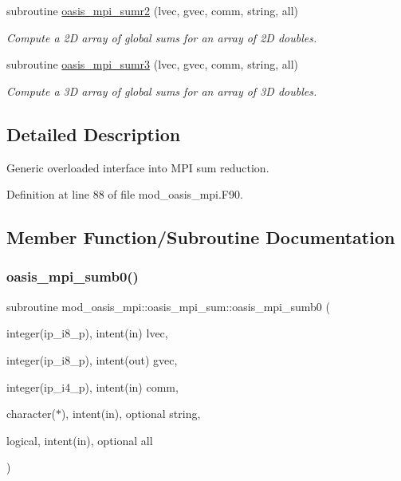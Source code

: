 \begin{DoxyCompactItemize}
subroutine \hyperlink{interfacemod__oasis__mpi_1_1oasis__mpi__sum_a45b443ca4b94c71ad7be5e6b653d8b1f}{oasis\+\_\+mpi\+\_\+sumr2} (lvec, gvec, comm, string, all)
\begin{DoxyCompactList}\small\item\em Compute a 2D array of global sums for an array of 2D doubles. \end{DoxyCompactList}\item 
subroutine \hyperlink{interfacemod__oasis__mpi_1_1oasis__mpi__sum_a31d24332ccc66502fcb78e5f69d19c45}{oasis\+\_\+mpi\+\_\+sumr3} (lvec, gvec, comm, string, all)
\begin{DoxyCompactList}\small\item\em Compute a 3D array of global sums for an array of 3D doubles. \end{DoxyCompactList}\end{DoxyCompactItemize}


\subsection{Detailed Description}
Generic overloaded interface into M\+PI sum reduction. 

Definition at line 88 of file mod\+\_\+oasis\+\_\+mpi.\+F90.



\subsection{Member Function/\+Subroutine Documentation}
\mbox{\label{interfacemod__oasis__mpi_1_1oasis__mpi__sum_a8d3b0d2544f1f360d83076b3d6dfe9e9}} 
\subsubsection{\texorpdfstring{oasis\+\_\+mpi\+\_\+sumb0()}{oasis\_mpi\_sumb0()}}
{\footnotesize\ttfamily subroutine mod\+\_\+oasis\+\_\+mpi\+::oasis\+\_\+mpi\+\_\+sum\+::oasis\+\_\+mpi\+\_\+sumb0 (\begin{DoxyParamCaption}\item[{integer(ip\+\_\+i8\+\_\+p), intent(in)}]{lvec,  }\item[{integer(ip\+\_\+i8\+\_\+p), intent(out)}]{gvec,  }\item[{integer(ip\+\_\+i4\+\_\+p), intent(in)}]{comm,  }\item[{character($\ast$), intent(in), optional}]{string,  }\item[{logical, intent(in), optional}]{all }\end{DoxyParamCaption})\hspace{0.3cm}{\ttfamily [private]}}



